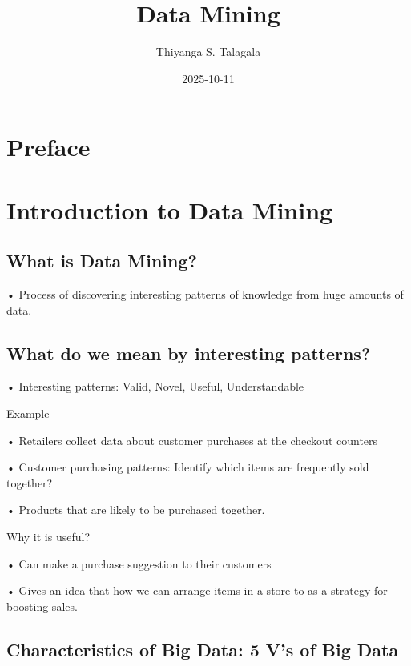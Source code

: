 \documentclass[
  letterpaper,
  DIV=11,
  numbers=noendperiod]{scrreprt}
\title{Data Mining}
\author{Thiyanga S. Talagala}
\date{2025-10-11}
\renewcommand*\contentsname{Table of contents}
\newcommand\contentsname{Table of contents}
\begin{document}
\maketitle

\renewcommand*\contentsname{Table of contents}
{
\hypersetup{linkcolor=}
\setcounter{tocdepth}{2}
\tableofcontents
}


\chapter*{Preface}\label{preface}



\chapter{Introduction to Data Mining}\label{introduction-to-data-mining}

\section{What is Data Mining?}\label{what-is-data-mining}

• Process of discovering interesting patterns of knowledge from huge
amounts of data.

\section{What do we mean by interesting
patterns?}\label{what-do-we-mean-by-interesting-patterns}

• Interesting patterns: Valid, Novel, Useful, Understandable

Example

• Retailers collect data about customer purchases at the checkout
counters

• Customer purchasing patterns: Identify which items are frequently sold
together?

• Products that are likely to be purchased together.

Why it is useful?

• Can make a purchase suggestion to their customers

• Gives an idea that how we can arrange items in a store to as a
strategy for boosting sales.

\section{Characteristics of Big Data: 5 V's of Big
Data}\label{characteristics-of-big-data-5-vs-of-big-data}
\end{document}
